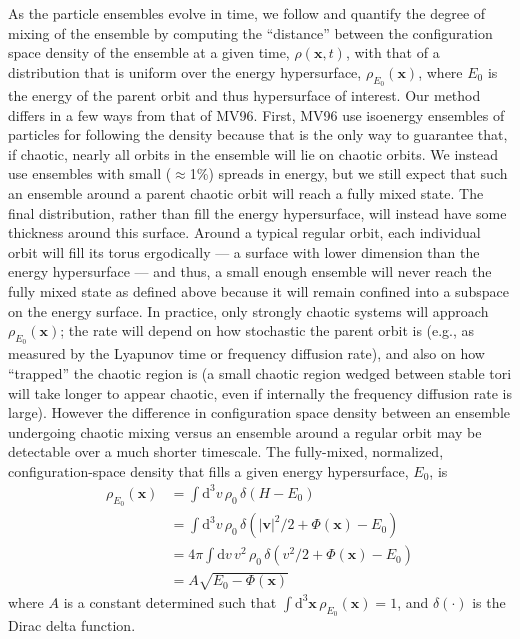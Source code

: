 \documentclass[letterpaper,12pt,preprint]{aastex}
\newcommand{\dd}{\mathrm{d}}
\newcommand{\bs}[1]{\boldsymbol{#1}}
\begin{document}
As the particle ensembles evolve in time, we follow \citet[][hereafter MV96]{merritt96} and quantify the degree of mixing of the ensemble by computing the ``distance'' between the configuration space density of the ensemble at a given time, $\rho(\bs{x},t)$, with that of a distribution that is uniform over the energy hypersurface, $\rho_{E_0}(\bs{x})$, where $E_0$ is the energy of the parent orbit and thus hypersurface of interest. Our method differs in a few ways from that of MV96. First, MV96 use isoenergy ensembles of particles for following the density because that is the only way to guarantee that, if chaotic, nearly all orbits in the ensemble will lie on chaotic orbits. We instead use ensembles with small ($\approx$1\%) spreads in energy, but we still expect that such an ensemble around a parent chaotic orbit will reach a fully mixed state. The final distribution, rather than fill the energy hypersurface, will instead have some thickness around this surface. Around a typical regular orbit, each individual orbit will fill its torus ergodically --- a surface with lower dimension than the energy hypersurface --- and thus, a small enough ensemble will never reach the fully mixed state as defined above because it will remain confined into a subspace on the energy surface. In practice, only strongly chaotic systems will approach $\rho_{E_0}(\bs{x})$; the rate will depend on how stochastic the parent orbit is (e.g., as measured by the Lyapunov time or frequency diffusion rate), and also on how ``trapped'' the chaotic region is (a small chaotic region wedged between stable tori will take longer to appear chaotic, even if internally the frequency diffusion rate is large). However the difference in configuration space density between an ensemble undergoing chaotic mixing versus an ensemble around a regular orbit may be detectable over a much shorter timescale. The fully-mixed, normalized, configuration-space density that fills a given energy hypersurface, $E_0$, is 
\begin{align}
	\rho_{E_0}(\bs{x}) &= \int \dd^3v \, \rho_0 \, \delta(H - E_0)\\
	&= \int \dd^3v \, \rho_0 \, \delta\left(|\bs{v}|^2/2 + \Phi(\bs{x}) - E_0\right)\\
	&= 4\pi \int \dd v \, v^2 \, \rho_0 \, \delta\left(v^2/2 + \Phi(\bs{x}) - E_0\right)\\
	&= A \sqrt{E_0 - \Phi(\bs{x})}
\end{align}
where $A$ is a constant determined such that $\int \dd^3\bs{x} \, \rho_{E_0}(\bs{x}) = 1$, and $\delta(\cdot)$ is the Dirac delta function. 
\end{document}
